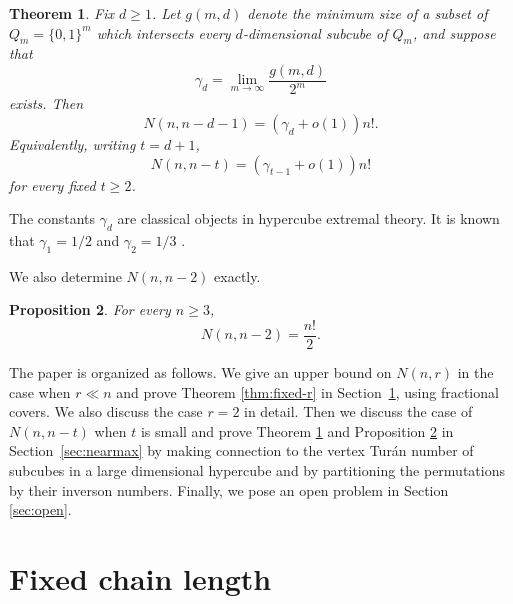 \documentclass[11pt]{article}
\newtheorem{theorem}{Theorem}[section]
\newtheorem{proposition}[theorem]{Proposition}
\newtheorem{corollary}[theorem]{Corollary}
\theoremstyle{definition}
\theoremstyle{remark}
\begin{document}



\begin{theorem}\label{thm:near-maximal-gamma}
Fix $d\ge 1$. Let $g(m,d)$ denote the minimum size of a subset of $Q_m=\{0,1\}^m$ which intersects every $d$-dimensional subcube of $Q_m$, and suppose that
\[
\gamma_d=\lim_{m\to\infty}\frac{g(m,d)}{2^m}
\]
exists. Then
\[
N(n,n-d-1)=(\gamma_d+o(1))n!.
\]
Equivalently, writing $t=d+1$,
\[
N(n,n-t)=(\gamma_{t-1}+o(1))n!
\]
for every fixed $t\ge 2$.
\end{theorem}

The constants $\gamma_d$ are classical objects in hypercube extremal theory.  It is known that $\gamma_1=1/2$ and $\gamma_2=1/3$ \citep{Kostochka1976,JohnsonEntringer1989}.  %


We also determine $N(n,n-2)$ exactly.
\begin{proposition}\label{cor:nminus2}
For every $n\ge 3$,
\[
   N(n,n-2)=\frac{n!}{2}.
\]
\end{proposition}

The paper is organized as follows. We give an upper bound on $N(n,r)$ in the case when $r\ll n$ and prove Theorem \ref{thm:fixed-r} in
Section~\ref{sec:fixed}, using fractional covers. We also discuss the case $r=2$ in detail. Then we  discuss the case of $N(n,n-t)$ when $t$ is small and prove Theorem \ref{thm:near-maximal-gamma} and Proposition \ref{cor:nminus2} in Section~\ref{sec:nearmax} by making connection to the vertex Turán number of subcubes in a large dimensional hypercube and by partitioning the permutations by their inverson numbers. Finally, we pose an open problem in Section \ref{sec:open}.

\section{Fixed chain length}\label{sec:fixed}
\end{document}
